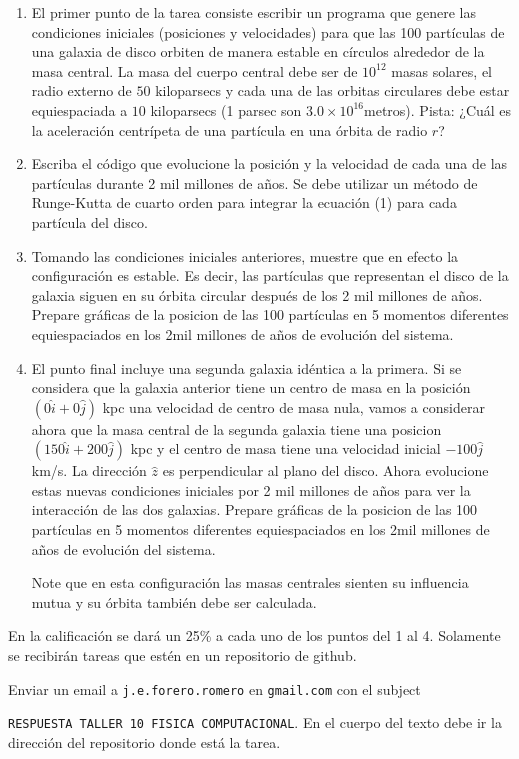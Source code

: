 \documentclass{article}
\begin{document}
\begin{enumerate}
\item El primer punto de la tarea consiste escribir un programa que genere
  las condiciones  iniciales (posiciones y velocidades) para que las
  100 part\'iculas de una galaxia de disco orbiten de manera estable
  en c\'irculos alrededor de la masa  central. La masa del cuerpo
  central debe ser de $10^{12}$ masas solares, el radio externo de
  $50$ kiloparsecs y cada una de las orbitas circulares debe estar
  equiespaciada a $10$ kiloparsecs (1 parsec son
  $3.0\times10^{16}$metros).  
Pista: ¿Cu\'al es la aceleraci\'on centr\'ipeta de una part\'icula en una
\'orbita de radio $r$?
\item 
  Escriba el c\'odigo que evolucione la posici\'on y la velocidad de
  cada una de las part\'iculas durante 2 mil millones de
  a\~nos.  Se debe utilizar un m\'etodo de Runge-Kutta de cuarto orden
  para integrar la ecuaci\'on (1) para cada part\'icula del disco. 
\item 
  Tomando las condiciones iniciales anteriores, muestre que en efecto
  la configuraci\'on es estable. Es decir, las part\'iculas que
  representan el disco de la galaxia siguen en su \'orbita circular
  despu\'es de los 2 mil millones de a\~nos. Prepare gr\'aficas de la posicion de
  las 100 part\'iculas en 5 momentos diferentes equiespaciados en los
  2mil millones de a\~nos de evoluci\'on del sistema.
\item 
  El punto final incluye una segunda galaxia id\'entica a la
  primera. Si se considera que la galaxia anterior tiene un centro de
  masa en la posici\'on $(0\hat{i}+0\hat{j})$ kpc una velocidad de centro de
  masa nula, vamos a considerar ahora que la masa central de la segunda galaxia
  tiene una posicion $(150\hat{i}+200\hat{j})$ kpc y el centro de masa
  tiene una velocidad inicial $-100\hat{j}$ km/s. La
  direcci\'on $\hat{z}$ es perpendicular al plano del disco. Ahora
  evolucione estas nuevas condiciones iniciales por 2 mil millones de
  a\~nos para ver la interacci\'on de las dos galaxias.  Prepare gr\'aficas de la posicion de
  las 100 part\'iculas en 5 momentos diferentes equiespaciados en los
  2mil millones de a\~nos de evoluci\'on del sistema.

  Note que en esta configuraci\'on las masas centrales sienten su
  influencia mutua y su \'orbita tambi\'en debe ser calculada.

\end{enumerate}



En la calificaci\'on se dar\'a un 25\% a cada uno de los puntos del 1
al 4. Solamente se recibir\'an tareas que est\'en en un repositorio de
github. 

Enviar un email a {\tt  j.e.forero.romero} en {\tt gmail.com} con el
subject


\verb"RESPUESTA TALLER 10 FISICA COMPUTACIONAL". En el cuerpo del texto
debe ir la direcci\'on del repositorio donde est\'a la tarea.  
\end{document}
